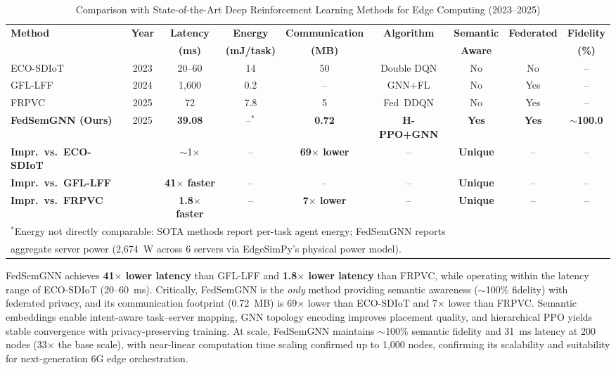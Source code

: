 \documentclass[conference]{IEEEtran}
\begin{document}
	\begin{table}[htbp]
		\centering
		\caption{Comparison with State-of-the-Art Deep Reinforcement Learning Methods for Edge Computing (2023--2025)}
		\label{tab:sota_comparison}
		\small
		\begin{tabular}{lcccccccc}
			\toprule
			\textbf{Method} & \textbf{Year} & \textbf{Latency} & \textbf{Energy} & \textbf{Communication} & \textbf{Algorithm} & \textbf{Semantic} & \textbf{Federated} & \textbf{Fidelity} \\
			& & \textbf{(ms)} & \textbf{(mJ/task)} & \textbf{(MB)} & & \textbf{Aware} & & \textbf{(\%)} \\
			\midrule
			ECO-SDIoT~\cite{zhu2023eco} & 2023 & 20--60 & 14 & 50 & Double DQN & No & No & -- \\
			GFL-LFF~\cite{regan2024gfl} & 2024 & 1{,}600 & 0.2 & -- & GNN+FL & No & Yes & -- \\
			FRPVC~\cite{qian2025frpvc} & 2025 & 72 & 7.8 & 5 & Fed~DDQN & No & Yes & -- \\
			\midrule
			\textbf{FedSemGNN (Ours)} & 2025 & \textbf{39.08} & --$^*$ & \textbf{0.72} & \textbf{H-PPO+GNN} & \textbf{Yes} & \textbf{Yes} & \textbf{$\sim$100.0} \\
			\midrule
			\textbf{Impr.\ vs.\ ECO-SDIoT} & & {$\sim$1$\times$} & -- & \textbf{69$\times$ lower} & -- & \textbf{Unique} & -- & -- \\
			\textbf{Impr.\ vs.\ GFL-LFF} & & \textbf{41$\times$ faster} & -- & -- & -- & \textbf{Unique} & -- & -- \\
			\textbf{Impr.\ vs.\ FRPVC} & & \textbf{1.8$\times$ faster} & -- & \textbf{7$\times$ lower} & -- & \textbf{Unique} & -- & -- \\
			\bottomrule
			\multicolumn{9}{l}{\footnotesize $^*$Energy not directly comparable: SOTA methods report per-task agent energy; FedSemGNN reports}\\
			\multicolumn{9}{l}{\footnotesize \phantom{$^*$}aggregate server power (2{,}674~W across 6 servers via EdgeSimPy's physical power model).}\\
		\end{tabular}
	\end{table}
	
	FedSemGNN achieves \textbf{41$\times$ lower latency} than GFL-LFF and \textbf{1.8$\times$ lower latency} than FRPVC, while operating within the latency range of ECO-SDIoT (20--60~ms).
	Critically, FedSemGNN is the \emph{only} method providing semantic awareness ($\sim$100\% fidelity) with federated privacy, and its communication footprint (0.72~MB) is 69$\times$ lower than ECO-SDIoT and 7$\times$ lower than FRPVC.
	Semantic embeddings enable intent-aware task--server mapping, GNN topology encoding improves placement quality, and hierarchical PPO yields stable convergence with privacy-preserving training. 
	At scale, FedSemGNN maintains $\sim$100\% semantic fidelity and 31~ms latency at 200 nodes (33$\times$ the base scale), with near-linear computation time scaling confirmed up to 1{,}000 nodes, confirming its scalability and suitability for next-generation 6G edge orchestration.
	
\end{document}
